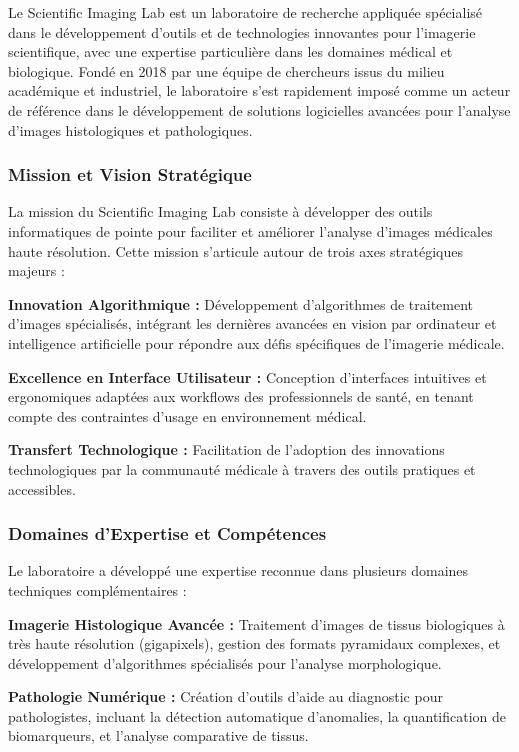 \documentclass[12pt,a4paper]{article}
\begin{document}
Le Scientific Imaging Lab est un laboratoire de recherche appliquée spécialisé dans le développement d'outils et de technologies innovantes pour l'imagerie scientifique, avec une expertise particulière dans les domaines médical et biologique. Fondé en 2018 par une équipe de chercheurs issus du milieu académique et industriel, le laboratoire s'est rapidement imposé comme un acteur de référence dans le développement de solutions logicielles avancées pour l'analyse d'images histologiques et pathologiques.

\subsubsection{Mission et Vision Stratégique}

La mission du Scientific Imaging Lab consiste à développer des outils informatiques de pointe pour faciliter et améliorer l'analyse d'images médicales haute résolution. Cette mission s'articule autour de trois axes stratégiques majeurs :

\textbf{Innovation Algorithmique :} Développement d'algorithmes de traitement d'images spécialisés, intégrant les dernières avancées en vision par ordinateur et intelligence artificielle pour répondre aux défis spécifiques de l'imagerie médicale.

\textbf{Excellence en Interface Utilisateur :} Conception d'interfaces intuitives et ergonomiques adaptées aux workflows des professionnels de santé, en tenant compte des contraintes d'usage en environnement médical.

\textbf{Transfert Technologique :} Facilitation de l'adoption des innovations technologiques par la communauté médicale à travers des outils pratiques et accessibles.

\subsubsection{Domaines d'Expertise et Compétences}

Le laboratoire a développé une expertise reconnue dans plusieurs domaines techniques complémentaires :

\textbf{Imagerie Histologique Avancée :} Traitement d'images de tissus biologiques à très haute résolution (gigapixels), gestion des formats pyramidaux complexes, et développement d'algorithmes spécialisés pour l'analyse morphologique.

\textbf{Pathologie Numérique :} Création d'outils d'aide au diagnostic pour pathologistes, incluant la détection automatique d'anomalies, la quantification de biomarqueurs, et l'analyse comparative de tissus.
\end{document}

